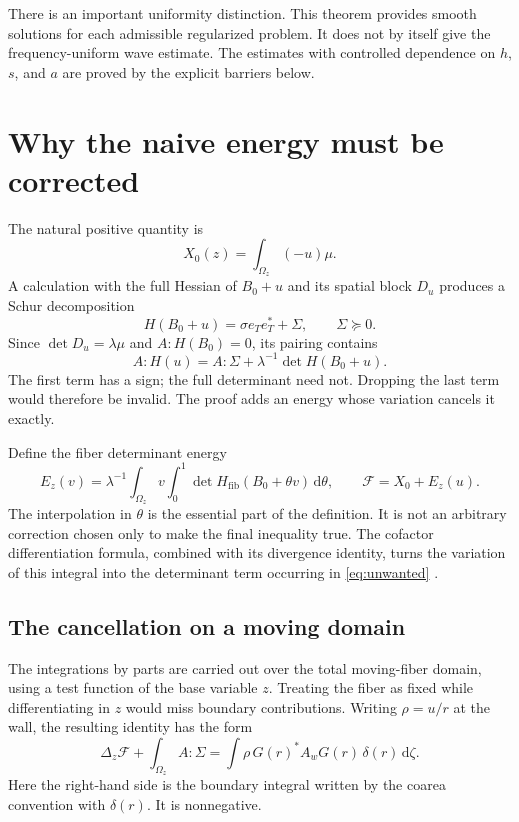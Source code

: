 \documentclass[11pt,a4paper]{article}
\numberwithin{equation}{section}
\theoremstyle{definition}
\theoremstyle{remark}
\newcommand{\dd}{\,\mathrm d}
\begin{document}
There is an important uniformity distinction. This theorem provides smooth
solutions for each admissible regularized problem. It does not by itself give
the frequency-uniform wave estimate. The estimates with controlled dependence
on $h$, $s$, and $a$ are proved by the explicit barriers below.

\section{Why the naive energy must be corrected}
\label{sec:energy}
The natural positive quantity is
\[
 X_0(z)=\int_{\Omega_z}(-u)\mu.
\]
A calculation with the full Hessian of $B_0+u$ and its spatial block $D_u$
produces a Schur decomposition
\[
 H(B_0+u)=\sigma e_Te_T^*+\Sigma,\qquad \Sigma\succeq0.
\]
Since $\det D_u=\lambda\mu$ and $A:H(B_0)=0$, its pairing contains
\begin{equation}\label{eq:unwanted}
 A:H(u)=A:\Sigma+\lambda^{-1}\det H(B_0+u).
\end{equation}
The first term has a sign; the full determinant need not. Dropping the last
term would therefore be invalid. The proof adds an energy whose variation
cancels it exactly.

Define the fiber determinant energy
\[
 E_z(v)=\lambda^{-1}\int_{\Omega_z}v
       \int_0^1\det H_{\mathrm{fib}}(B_0+\theta v)\dd\theta,
 \qquad \mathcal F=X_0+E_z(u).
\]
The interpolation in $\theta$ is the essential part of the definition. It is
not an arbitrary correction chosen only to make the final inequality true.
The cofactor differentiation formula, combined with its divergence identity,
turns the variation of this integral into the determinant term occurring in
\eqref{eq:unwanted} \cite{energy,calculus}.

\subsection{The cancellation on a moving domain}
The integrations by parts are carried out over the total moving-fiber domain,
using a test function of the base variable $z$. Treating the fiber as fixed
while differentiating in $z$ would miss boundary contributions. Writing
$\rho=u/r$ at the wall, the resulting identity has the form
\begin{equation}\label{eq:energyidentity}
 \Delta_z\mathcal F+\int_{\Omega_z}A:\Sigma
 =\int \rho\,G(r)^*A_wG(r)\,\delta(r)\dd\zeta.
\end{equation}
Here the right-hand side is the boundary integral written by the coarea
convention with $\delta(r)$. It is nonnegative.
\end{document}
